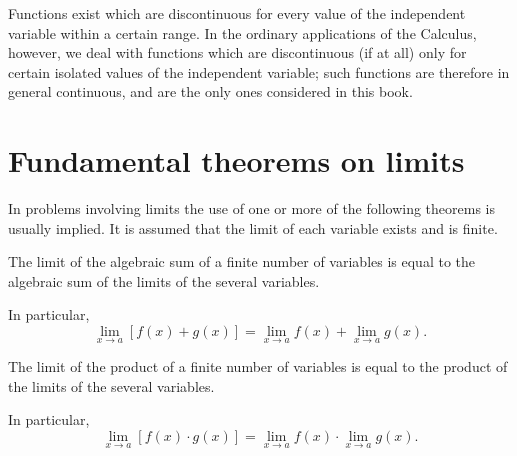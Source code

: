 
Functions exist which are discontinuous for every value of the 
independent variable within a certain range. In the ordinary 
applications of the Calculus, however, we deal with functions 
which are discontinuous (if at all) only for certain isolated 
values of the independent variable; such functions are therefore 
in general continuous, and are the only ones considered in this book.

\section{Fundamental theorems on limits}
\label{sec:20}

In problems involving limits the use of one or more of the 
following theorems is usually implied. It is assumed that the 
limit of each variable exists and is finite.

\begin{theorem}
{\rm 
\label{thrm:I-20}
The limit of the algebraic sum of a finite number of 
variables is equal to the algebraic sum of the 
limits of the several variables. 

In particular,
\[
\lim_{x\to a} [f(x)+g(x)] = \lim_{x\to a} f(x)
+\lim_{x\to a} g(x).
\]
}
\end{theorem}

\begin{theorem}
{\rm
\label{thrm:II-20}
The limit of the product of a finite number of variables is 
equal to the product of the limits of the several variables.

In particular,
\[
\lim_{x\to a} [f(x)\cdot g(x)] = \lim_{x\to a} f(x)
\cdot \lim_{x\to a} g(x).
\]
}
\end{theorem}

